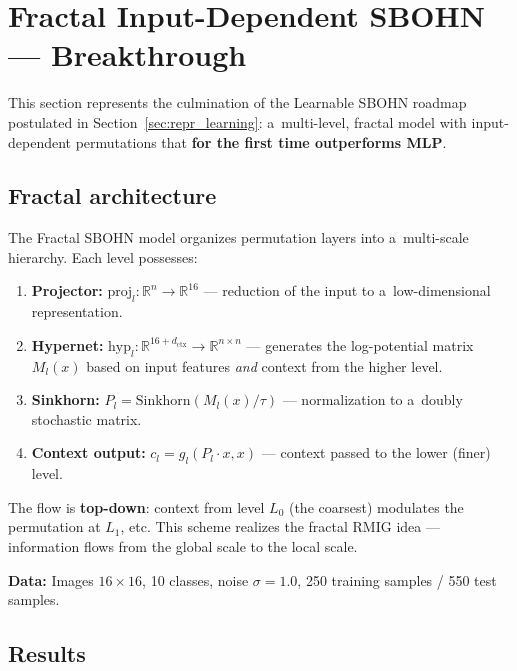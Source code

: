 \documentclass[11pt,a4paper]{report}
\begin{document}
\section{Fractal Input-Dependent SBOHN --- Breakthrough}\label{sec:fractal_sbohn}

This section represents the culmination of the Learnable SBOHN roadmap postulated in Section~\ref{sec:repr_learning}: a~multi-level, fractal model with input-dependent permutations that \textbf{for the first time outperforms MLP}.

\subsection{Fractal architecture}

The Fractal SBOHN model organizes permutation layers into a~multi-scale hierarchy. Each level possesses:
\begin{enumerate}
    \item \textbf{Projector:} $\text{proj}_l: \mathbb{R}^n \to \mathbb{R}^{16}$ --- reduction of the input to a~low-dimensional representation.
    \item \textbf{Hypernet:} $\text{hyp}_l: \mathbb{R}^{16 + d_{\text{ctx}}} \to \mathbb{R}^{n \times n}$ --- generates the log-potential matrix $M_l(x)$ based on input features \emph{and} context from the higher level.
    \item \textbf{Sinkhorn:} $P_l = \text{Sinkhorn}(M_l(x) / \tau)$ --- normalization to a~doubly stochastic matrix.
    \item \textbf{Context output:} $c_l = g_l(P_l \cdot x, x)$ --- context passed to the lower (finer) level.
\end{enumerate}

The flow is \textbf{top-down}: context from level $L_0$ (the coarsest) modulates the permutation at $L_1$, etc. This scheme realizes the fractal RMIG idea --- information flows from the global scale to the local scale.

\textbf{Data:} Images $16 \times 16$, 10 classes, noise $\sigma=1.0$, 250 training samples / 550 test samples.


\subsection{Results}
\end{document}
